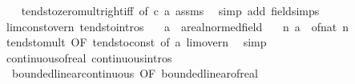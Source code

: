 \begin{isabellebody}
%
\isadelimproof
\ \ %
\endisadelimproof
%
\isatagproof
{}\isamarkupfalse%
\ tendsto{\isacharunderscore}{\kern0pt}zero{\isacharunderscore}{\kern0pt}mult{\isacharunderscore}{\kern0pt}right{\isacharunderscore}{\kern0pt}iff\ {\isacharbrackleft}{\kern0pt}of\ {\isachardoublequoteopen}{}{\isacharslash}{\kern0pt}c{\isachardoublequoteclose}\ a{\isacharbrackright}{\kern0pt}\ assms\ \isamarkupfalse%
\ {\isacharparenleft}{\kern0pt}simp\ add{\isacharcolon}{\kern0pt}\ field{\isacharunderscore}{\kern0pt}simps{\isacharparenright}{\kern0pt}%
\endisatagproof
{\isafoldproof}%
%
\isadelimproof
\isanewline
%
\endisadelimproof
\isanewline
{}\isamarkupfalse%
\ lim{\isacharunderscore}{\kern0pt}const{\isacharunderscore}{\kern0pt}over{\isacharunderscore}{\kern0pt}n\ {\isacharbrackleft}{\kern0pt}tendsto{\isacharunderscore}{\kern0pt}intros{\isacharbrackright}{\kern0pt}{\isacharcolon}{\kern0pt}\isanewline
\ \ \ a\ {\isacharcolon}{\kern0pt}{\isacharcolon}{\kern0pt}\ {\isachardoublequoteopen}{\isacharprime}{\kern0pt}a{\isacharcolon}{\kern0pt}{\isacharcolon}{\kern0pt}real{\isacharunderscore}{\kern0pt}normed{\isacharunderscore}{\kern0pt}field{\isachardoublequoteclose}\isanewline
\ \ \ {\isachardoublequoteopen}{\isacharparenleft}{\kern0pt}{\isasymlambda}n{\isachardot}{\kern0pt}\ a\ {\isacharslash}{\kern0pt}\ of{\isacharunderscore}{\kern0pt}nat\ n{\isacharparenright}{\kern0pt}\ {\isasymlonglonglongrightarrow}\ {}{\isachardoublequoteclose}\isanewline
%
\isadelimproof
\ \ %
\endisadelimproof
%
\isatagproof
{}\isamarkupfalse%
\ tendsto{\isacharunderscore}{\kern0pt}mult\ {\isacharbrackleft}{\kern0pt}OF\ tendsto{\isacharunderscore}{\kern0pt}const\ {\isacharbrackleft}{\kern0pt}of\ a{\isacharbrackright}{\kern0pt}\ lim{\isacharunderscore}{\kern0pt}{}{\isacharunderscore}{\kern0pt}over{\isacharunderscore}{\kern0pt}n{\isacharbrackright}{\kern0pt}\ \isamarkupfalse%
\ simp%
\endisatagproof
{\isafoldproof}%
%
\isadelimproof
\isanewline
%
\endisadelimproof
\isanewline
{}\isamarkupfalse%
\ continuous{\isacharunderscore}{\kern0pt}of{\isacharunderscore}{\kern0pt}real\ {\isacharbrackleft}{\kern0pt}continuous{\isacharunderscore}{\kern0pt}intros{\isacharbrackright}{\kern0pt}\ {\isacharequal}{\kern0pt}\isanewline
\ \ bounded{\isacharunderscore}{\kern0pt}linear{\isachardot}{\kern0pt}continuous\ {\isacharbrackleft}{\kern0pt}OF\ bounded{\isacharunderscore}{\kern0pt}linear{\isacharunderscore}{\kern0pt}of{\isacharunderscore}{\kern0pt}real{\isacharbrackright}{\kern0pt}\isanewline

\end{isabellebody}
